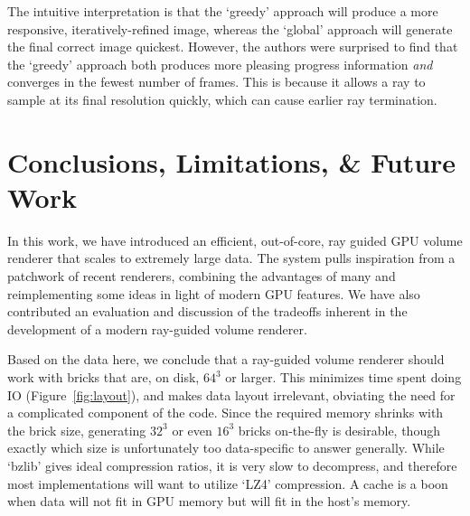 



The intuitive interpretation is that the `greedy' approach will produce
a more responsive, iteratively-refined image, whereas the `global'
approach will generate the final correct image quickest.  However, the
authors were surprised to find that the `greedy' approach both produces
more pleasing progress information \emph{and} converges in the fewest
number of frames.  This is because it allows a ray to sample at its
final resolution quickly, which can cause earlier ray termination.

\section{Conclusions, Limitations, \& Future Work}
\label{sec:conclusion}

In this work, we have introduced an efficient, out-of-core, ray guided
GPU volume renderer that scales to extremely large data.  The system
pulls inspiration from a patchwork of recent renderers, combining the
advantages of many and reimplementing some ideas in light of modern GPU
features.  We have also contributed an evaluation and discussion of the
tradeoffs inherent in the development of a modern ray-guided volume
renderer.

Based on the data here, we conclude that a ray-guided volume renderer
should work with bricks that are, on disk, $64^3$ or larger.  This
minimizes time spent doing IO (Figure~\ref{fig:layout}), and makes
data layout irrelevant, obviating the need for a complicated component
of the code.  Since the required memory shrinks with the brick size,
generating $32^3$ or even $16^3$ bricks on-the-fly is desirable,
though exactly which size is unfortunately too data-specific to answer
generally.  While `bzlib' gives ideal compression ratios, it is very
slow to decompress, and therefore most implementations will want to
utilize `LZ4' compression.  A cache is a boon when data will not fit in
GPU memory but will fit in the host's memory.

